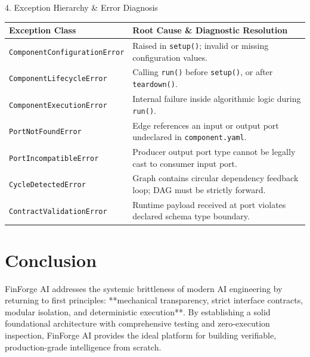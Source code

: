 \documentclass[11pt,a4paper]{article}
\begin{document}
\begin{cheatsheetcard}{4. Exception Hierarchy \& Error Diagnosis}
\small
\begin{tabularx}{\linewidth}{p{4.5cm} X}
\textbf{Exception Class} & \textbf{Root Cause \& Diagnostic Resolution} \\
\midrule
\texttt{ComponentConfigurationError} & Raised in \texttt{setup()}; invalid or missing configuration values. \\
\texttt{ComponentLifecycleError} & Calling \texttt{run()} before \texttt{setup()}, or after \texttt{teardown()}. \\
\texttt{ComponentExecutionError} & Internal failure inside algorithmic logic during \texttt{run()}. \\
\texttt{PortNotFoundError} & Edge references an input or output port undeclared in \texttt{component.yaml}. \\
\texttt{PortIncompatibleError} & Producer output port type cannot be legally cast to consumer input port. \\
\texttt{CycleDetectedError} & Graph contains circular dependency feedback loop; DAG must be strictly forward. \\
\texttt{ContractValidationError} & Runtime payload received at port violates declared schema type boundary. \\
\end{tabularx}
\end{cheatsheetcard}

\section{Conclusion}
FinForge AI addresses the systemic brittleness of modern AI engineering by returning to first principles: **mechanical transparency, strict interface contracts, modular isolation, and deterministic execution**. By establishing a solid foundational architecture with comprehensive testing and zero-execution inspection, FinForge AI provides the ideal platform for building verifiable, production-grade intelligence from scratch.
\end{document}
